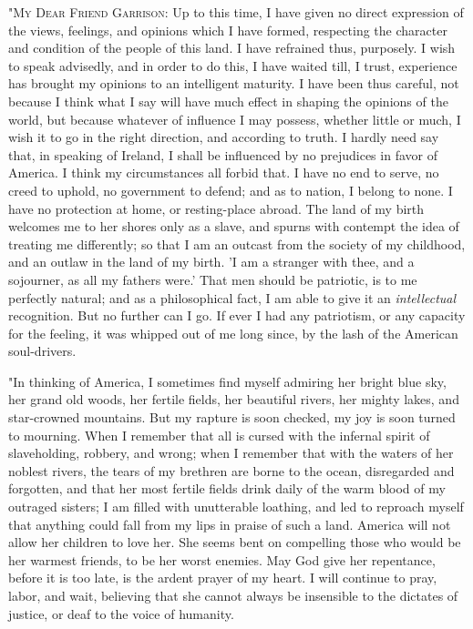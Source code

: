 "\textsc{My Dear Friend Garrison}: Up to this time, I have given no
direct expression of the views, feelings, and opinions which I have
formed, respecting the character and condition of the people of this
land. I have refrained thus, purposely. I wish to speak advisedly, and
in order to do this, I have waited till, I trust, experience has brought
my opinions to an intelligent maturity. I have been thus careful, not
because I think what I say will have much effect in shaping the opinions
of the world, but because whatever of influence I may possess, whether
little or much, I wish it to go in the right direction, and according to
truth. I hardly need say that, in speaking of Ireland, I shall be
influenced by no prejudices in favor of America. I think my
circumstances all forbid that. I have no end to serve, no creed to
uphold, no government to defend; and as to nation, I belong to none. I
have no protection at home, or resting-place abroad. The land of my
birth welcomes me to her shores only as a slave, and spurns with
contempt the idea of treating me differently; so that I am an outcast
from the society of my childhood, and an outlaw in the land of my birth.
'I am a stranger with thee, and a sojourner, as all my
{\protect\hypertarget{369}{}{}}fathers were.' That men should be
patriotic, is to me perfectly natural; and as a philosophical fact, I am
able to give it an \emph{intellectual} recognition. But no further can I
go. If ever I had any patriotism, or any capacity for the feeling, it
was whipped out of me long since, by the lash of the American
soul-drivers.

"In thinking of America, I sometimes find myself admiring her bright
blue sky, her grand old woods, her fertile fields, her beautiful rivers,
her mighty lakes, and star-crowned mountains. But my rapture is soon
checked, my joy is soon turned to mourning. When I remember that all is
cursed with the infernal spirit of slaveholding, robbery, and wrong;
when I remember that with the waters of her noblest rivers, the tears of
my brethren are borne to the ocean, disregarded and forgotten, and that
her most fertile fields drink daily of the warm blood of my outraged
sisters; I am filled with unutterable loathing, and led to reproach
myself that anything could fall from my lips in praise of such a land.
America will not allow her children to love her. She seems bent on
compelling those who would be her warmest friends, to be her worst
enemies. May God give her repentance, before it is too late, is the
ardent prayer of my heart. I will continue to pray, labor, and wait,
believing that she cannot always be insensible to the dictates of
justice, or deaf to the voice of humanity.

